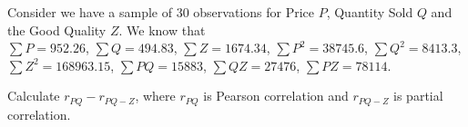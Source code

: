 
\begin{question}
Consider we have a sample of 30 observations for Price \(P\), Quantity Sold \(Q\) and the Good Quality \(Z\).
We know that\\
\(\sum{P} = 952.26\),
\(\sum{Q} = 494.83\),
\(\sum{Z} = 1674.34\),
\(\sum{P^2} = 38745.6\),
\(\sum{Q^2} = 8413.3\),
\(\sum{Z^2} = 168963.15\),
\(\sum{PQ} = 15883\),
\(\sum{QZ} = 27476\),
\(\sum{PZ} = 78114\).

Calculate \(r_{PQ} - r_{PQ-Z}\), where \(r_{PQ}\) is Pearson correlation and \(r_{PQ-Z}\) is partial correlation.
\end{question}


